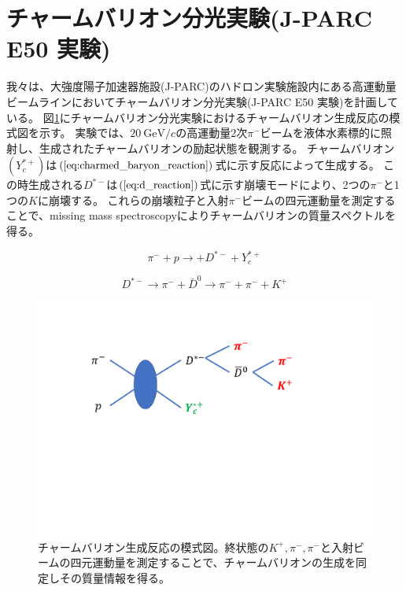\section{チャームバリオン分光実験(J-PARC E50 実験)}
我々は、大強度陽子加速器施設(J-PARC)のハドロン実験施設内にある高運動量ビームラインにおいてチャームバリオン分光実験(J-PARC E50 実験)を計画している。
図\ref{fig:charmed_baryon_generation}にチャームバリオン分光実験におけるチャームバリオン生成反応の模式図を示す。
実験では、$\SI{20}{\GeV / c}$の高運動量2次$\pi^-$ビームを液体水素標的に照射し、生成されたチャームバリオンの励起状態を観測する。
チャームバリオン$(Y_c^{*+})$は$(\ref{eq:charmed_baryon_reaction})$式に示す反応によって生成する。
この時生成される$D^{*-}$は$(\ref{eq:d_reaction})$式に示す崩壊モードにより、2つの$\pi^-$と1つの$K$に崩壊する。
これらの崩壊粒子と入射$\pi^-$ビームの四元運動量を測定することで、missing mass spectroscopyによりチャームバリオンの質量スペクトルを得る。

\begin{equation}
  \label{eq:charmed_baryon_reaction}
  \pi^- + p \rightarrow + D^{*-} + Y_c^{*+}
\end{equation}

\begin{equation}
  \label{eq:d_reaction}
  D^{*-} \rightarrow \pi^- + \bar{D}^0 \rightarrow \pi^- + \pi^- + K^+
\end{equation}

\begin{figure}[htbp]
  \label{fig:charmed_baryon_generation}
  \centering
  \includegraphics[width=15cm]{images/chapter1/charmed_baryon_generation.pdf}
  \caption{チャームバリオン生成反応の模式図。終状態の$K^+,\pi^-,\pi^-$と入射ビームの四元運動量を測定することで、チャームバリオンの生成を同定しその質量情報を得る。}
\end{figure}